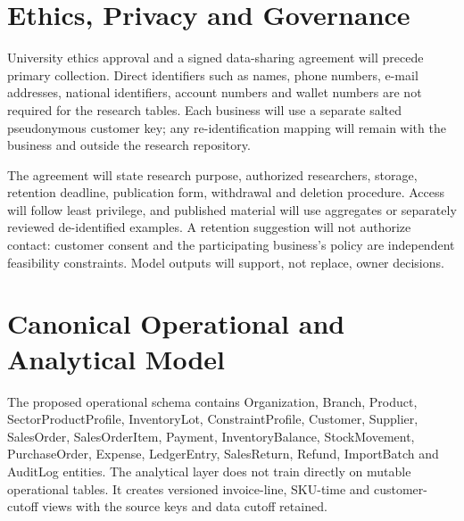 \section{Ethics, Privacy and Governance}

University ethics approval and a signed data-sharing agreement will precede
primary collection. Direct identifiers such as names, phone numbers, e-mail
addresses, national identifiers, account numbers and wallet numbers are not
required for the research tables. Each business will use a separate salted
pseudonymous customer key; any re-identification mapping will remain with the
business and outside the research repository.

The agreement will state research purpose, authorized researchers, storage,
retention deadline, publication form, withdrawal and deletion procedure. Access
will follow least privilege, and published material will use aggregates or
separately reviewed de-identified examples. A retention suggestion will not
authorize contact: customer consent and the participating business's policy are
independent feasibility constraints. Model outputs will support, not replace,
owner decisions.

\section{Canonical Operational and Analytical Model}

The proposed operational schema contains Organization, Branch, Product,
SectorProductProfile, InventoryLot, ConstraintProfile, Customer, Supplier,
SalesOrder, SalesOrderItem, Payment, InventoryBalance,
StockMovement, PurchaseOrder, Expense, LedgerEntry, SalesReturn, Refund,
ImportBatch and AuditLog entities. The analytical layer does not train directly
on mutable operational tables. It creates versioned invoice-line, SKU-time and
customer-cutoff views with the source keys and data cutoff retained.

